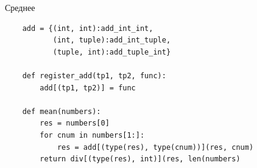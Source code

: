 \documentclass{article}
\begin{document}
\begin{center} Среднее \end{center}
\begin{lstlisting}
    add = {(int, int):add_int_int, 
           (int, tuple):add_int_tuple,
           (tuple, int):add_tuple_int}

    def register_add(tp1, tp2, func):
        add[(tp1, tp2)] = func

    def mean(numbers):
        res = numbers[0]
        for cnum in numbers[1:]:
            res = add[(type(res), type(cnum))](res, cnum)
        return div[(type(res), int)](res, len(numbers)
\end{lstlisting}
\newpage

\end{document}
